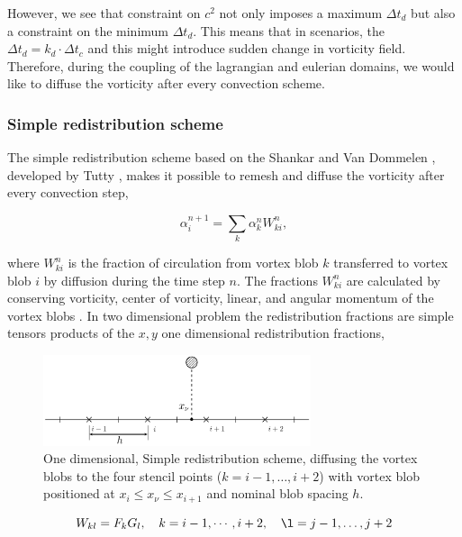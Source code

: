 However, we see that constraint on $c^2$ not only imposes a maximum $\Delta t_d$ but also a constraint on the minimum $\Delta t_d$. This means that in scenarios, the $\Delta t_d = k_d \cdot \Delta t_c$ and this might introduce sudden change in vorticity field. Therefore, during the coupling of the lagrangian and eulerian domains, we would like to diffuse the vorticity after every convection scheme.

\subsubsection*{Simple redistribution scheme}

The simple redistribution scheme based on the Shankar and Van Dommelen \cite{Shankar1996}, developed by Tutty \cite{2010arXiv1009.0166T}, makes it possible to remesh and diffuse the vorticity after every convection step, 

	\begin{equation}
	\alpha_i^{n+1} = \sum_k \alpha_k^n W_{ki}^n, 
	\end{equation}

where $W_{ki}^n$ is the fraction of circulation from vortex blob $k$ transferred to vortex blob $i$ by diffusion during the time step $n$. The fractions $W_{ki}^n$ are calculated by conserving vorticity, center of vorticity, linear, and angular momentum of the vortex blobs \cite{2010arXiv1009.0166T}. In two dimensional problem the redistribution fractions are simple tensors products of the $x,y$ one dimensional redistribution fractions,


	\begin{figure}[!b]
	\centering
	\includegraphics[width=0.7\textwidth]{figures/lagrangian/simpleRedistribution.pdf}
	\caption{One dimensional, Simple redistribution scheme, diffusing the vortex blobs to the four stencil points ($k=i-1,\dots,i+2$) with vortex blob positioned at $x_i \le x_{\nu} \le x_{i+1}$ and nominal blob spacing $h$.}
	\label{fig:simpleRedistribution}
	\end{figure}

	\begin{equation}
	W_{kl} = F_k G_l, \quad k = i-1,\cdots,i+2, \quad \l = j-1,\dots,j+2
	\end{equation}

